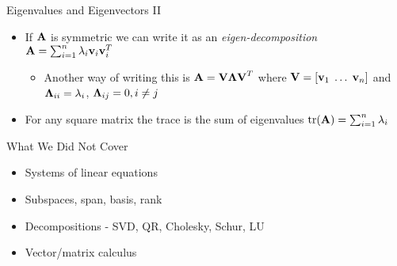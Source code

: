 \documentclass{beamer}
\begin{document}
\begin{frame}{Eigenvalues and Eigenvectors II}
\begin{itemize} 
  \item If $\textbf{A}$ is symmetric we can write it as an \emph{eigen-decomposition} $\textbf{A} = \sum_{i=1}^n \lambda_i\textbf{v}_i\textbf{v}_i^T$ 
\begin{itemize}
\item Another way of writing this is  $\textbf{A} = \textbf{V}\mbox{\boldmath$\Lambda$}\textbf{V}^T$ where $\textbf{V} = [\textbf{v}_1 \; \ldots \; \textbf{v}_n]$ and $\mbox{\boldmath$\Lambda$}_{ii} = \lambda_i$, $\mbox{\boldmath$\Lambda$}_{ij} = 0, i \neq j$  
\end{itemize} 
 \item For any square matrix the trace is the sum of eigenvalues $\mbox{tr}(\textbf{A}) = \sum_{i=1}^n \lambda_i$
\end{itemize}
\end{frame}


\begin{frame}{What We Did Not Cover}  
\begin{itemize} 
 \item Systems of linear equations 
 \item Subspaces, span, basis, rank 
 \item Decompositions - SVD, QR, Cholesky, Schur, LU 
 \item Vector/matrix calculus 
\end{itemize}
\end{frame}
\end{document}
